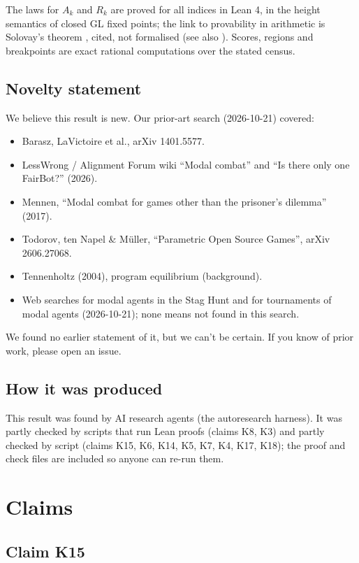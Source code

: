 \documentclass{article}
\begin{document}
The laws for $A_k$ and $R_k$ are proved for all indices in Lean 4, in the height semantics of
closed GL fixed points; the link to provability in arithmetic is Solovay's theorem
\cite{solovay1976provability}, cited, not formalised (see also \cite{boolos1993logic}). Scores, regions
and breakpoints are exact rational computations over the stated census.

\subsection*{Novelty statement}

We believe this result is new. Our prior-art search (2026-10-21) covered:

\begin{itemize}
\item Barasz, LaVictoire et al., arXiv 1401.5577.
\item LessWrong / Alignment Forum wiki ``Modal combat'' and ``Is there only one FairBot?'' (2026).
\item Mennen, ``Modal combat for games other than the prisoner's dilemma'' (2017).
\item Todorov, ten Napel \& Müller, ``Parametric Open Source Games'', arXiv 2606.27068.
\item Tennenholtz (2004), program equilibrium (background).
\item Web searches for modal agents in the Stag Hunt and for tournaments of modal agents (2026-10-21); none means not found in this search.
\end{itemize}

We found no earlier statement of it, but we can't be certain. If you know of prior work, please open an issue.

\subsection*{How it was produced}

This result was found by AI research agents (the autoresearch harness). It was partly checked by scripts that run Lean proofs (claims K8, K3) and partly checked by script (claims K15, K6, K14, K5, K7, K4, K17, K18); the proof and check files are included so anyone can re-run them.

\section{Claims}

\subsection*{Claim K15}
\end{document}
